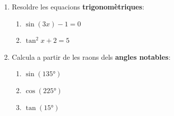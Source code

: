 \documentclass[12pt,a4paper]{article}
\newif\ifsolutions
\newcommand{\solucio}[1]{%
  \ifsolutions
    \begin{soluciobox}
      #1
    \end{soluciobox}
  \fi
}
\begin{document}
\begin{enumerate}[label=\textbf{\arabic*.}, leftmargin=*, itemsep=1.2em]
\begin{enumerate}[label=\textbf{\alph*.}, itemsep=0.8em]
\end{enumerate}

\item Resoldre les equacions \textbf{trigonomètriques}:

\begin{enumerate}[label=\textbf{\alph*.}, itemsep=0.8em]
\item $\sin(3x) - 1 = 0$

\solucio{%
  \[
    \sin(3x) = 1
    \;\Rightarrow\;
    3x = 90° + 360°k,\quad k\in\mathbb{Z}
  \]
  \[
    \boxed{x = 30° + 120°k, \quad k\in\mathbb{Z}}
  \]
  \textit{Primeres solucions ($k=0,1,2$):
  $x = 30°,\; 150°,\; 270°,\;\ldots$}
}

\item $\tan^2 x + 2 = 5$

\solucio{%
  \[
    \tan^2 x = 3
    \;\Rightarrow\;
    \tan x = \pm\sqrt{3}
  \]
  \[
    \tan x = \sqrt{3} \;\Rightarrow\; x = 60° + 180°k
    \qquad
    \tan x = -\sqrt{3} \;\Rightarrow\; x = -60° + 180°k
    \quad k\in\mathbb{Z}
  \]
  \[
    \boxed{x = \pm 60° + 180°k,\quad k\in\mathbb{Z}}
  \]
  \textit{Primeres solucions: $x = 60°,\;120°,\;240°,\;300°,\;\ldots$}
}

\end{enumerate}

\item Calcula a partir de les raons dels \textbf{angles notables}:

\begin{enumerate}[label=\textbf{\alph*.}, itemsep=0.8em]

  \item $\sin(135°)$

  \solucio{%
    $135° = 180° - 45°$ (segon quadrant, sinus positiu):
    \[
      \sin(135°) = \sin(180°-45°) = \sin(45°) = \boxed{\dfrac{\sqrt{2}}{2}}
    \]
  }

  \item $\cos(225°)$

  \solucio{%
    $225° = 180° + 45°$ (tercer quadrant, cosinus negatiu):
    \[
      \cos(225°) = \cos(180°+45°) = -\cos(45°) = \boxed{-\dfrac{\sqrt{2}}{2}}
    \]
  }

  \item $\tan(15°)$


\end{enumerate}
\end{enumerate}
\end{document}
